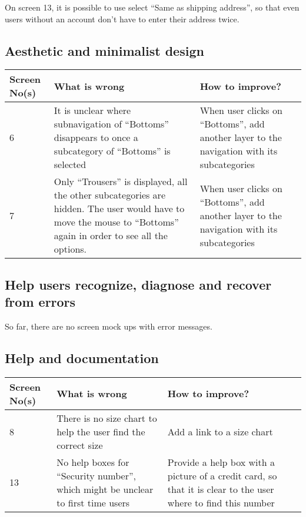 \documentclass[fontsize=12pt,paper=a4]{scrartcl}
\begin{document}
On screen 13, it is possible to use select ``Same as shipping address'', so that even users without an account don't have to enter their address twice. 

\subsection{Aesthetic and minimalist design}
\begin{table}[htdp]
\begin{center}
\begin{tabular}{|p{2cm}|p{6.5cm}|p{6.5cm}|}
\hline
\textbf{Screen No(s)} & \textbf{What is wrong} & \textbf{How to improve?} \\
\hline
6 & It is unclear where subnavigation of ``Bottoms'' disappears to once a subcategory of ``Bottoms'' is selected & When user clicks on ``Bottoms'', add another layer to the navigation with its subcategories \\
\hline
7 & Only ``Trousers'' is displayed, all the other subcategories are hidden. The user would have to move the mouse to ``Bottoms'' again in order to see all the options. & When user clicks on ``Bottoms'', add another layer to the navigation with its subcategories \\
\hline
\end{tabular}
\end{center}
\label{8_heurisitcs_eval}
\end{table}

\subsection{Help users recognize, diagnose and recover from errors}
So far, there are no screen mock ups with error messages. 

\subsection{Help and documentation}
\begin{table}[htdp]
\begin{center}
\begin{tabular}{|p{2cm}|p{6.5cm}|p{6.5cm}|}
\hline
\textbf{Screen No(s)} & \textbf{What is wrong} & \textbf{How to improve?} \\
\hline
8 & There is no size chart to help the user find the correct size & Add a link to a size chart \\
\hline
13 & No help boxes for ``Security number'', which might be unclear to first time users & Provide a help box with a picture of a credit card, so that it is clear to the user where to find this number \\
\hline
\end{tabular}
\end{center}
\label{10_heurisitcs_eval}
\end{table}
\end{document}
